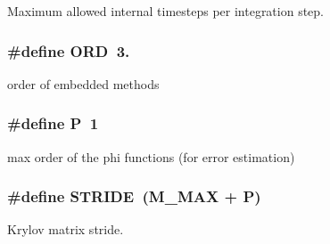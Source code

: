 Maximum allowed internal timesteps per integration step. 

\subsubsection[{\texorpdfstring{O\+RD}{ORD}}]{\setlength{\rightskip}{0pt plus 5cm}\#define O\+RD~3.}\hypertarget{exp4__props_8cuh_ac5232262b17b940a7b54e6e56439aa24}{}\label{exp4__props_8cuh_ac5232262b17b940a7b54e6e56439aa24}


order of embedded methods 

\subsubsection[{\texorpdfstring{P}{P}}]{\setlength{\rightskip}{0pt plus 5cm}\#define P~1}\hypertarget{exp4__props_8cuh_a2748566f4c443ee77aa831e63dbb5ebe}{}\label{exp4__props_8cuh_a2748566f4c443ee77aa831e63dbb5ebe}


max order of the phi functions (for error estimation) 

\subsubsection[{\texorpdfstring{S\+T\+R\+I\+DE}{STRIDE}}]{\setlength{\rightskip}{0pt plus 5cm}\#define S\+T\+R\+I\+DE~({\bf M\+\_\+\+M\+AX} + {\bf P})}\hypertarget{exp4__props_8cuh_a351d54267048643c4365f6a24641d0cf}{}\label{exp4__props_8cuh_a351d54267048643c4365f6a24641d0cf}


Krylov matrix stride. 

